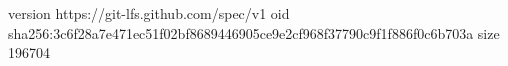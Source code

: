 version https://git-lfs.github.com/spec/v1
oid sha256:3c6f28a7e471ec51f02bf8689446905ce9e2cf968f37790c9f1f886f0c6b703a
size 196704
